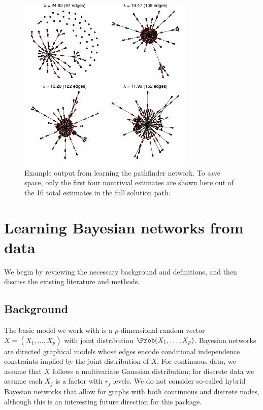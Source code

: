\documentclass[article]{jss}
\newcommand{\rv}{X}
\newcommand{\nlevel}{r}
\renewcommand{\|}{\,|\,}
\begin{document}
\begin{figure}[t!]
\centering
\includegraphics[width=0.75\textwidth]{pathfinder-grid.pdf}
\caption{Example output from learning the pathfinder network. To save space, only the first four nontrivial estimates are shown here out of the 16 total estimates in the full solution path.}
\label{fig:examplerun}
\end{figure}

\section{Learning Bayesian networks from data}
\label{sec:learningbns}

We begin by reviewing the necessary background and definitions, and then discuss  the existing literature and methods.

\subsection{Background}
\label{subsec:background}

The basic model we work with is a $p$-dimensional random vector $\rv=(\rv_{1},\ldots,\rv_{p})$ with joint distribution $\Prob(\rv_{1},\ldots,\rv_{p})$.
Bayesian networks are directed graphical models whose edges encode conditional independence constraints implied by the joint distribution of $\rv$. For continuous data, we assume that $\rv$ follows a multivariate Gaussian distribution; for discrete data we assume each $\rv_{j}$ is a factor with $\nlevel_{j}$ levels. We do not consider so-called hybrid Bayesian networks that allow for graphs with both continuous and discrete nodes, although this is an interesting future direction for this package.
\end{document}

